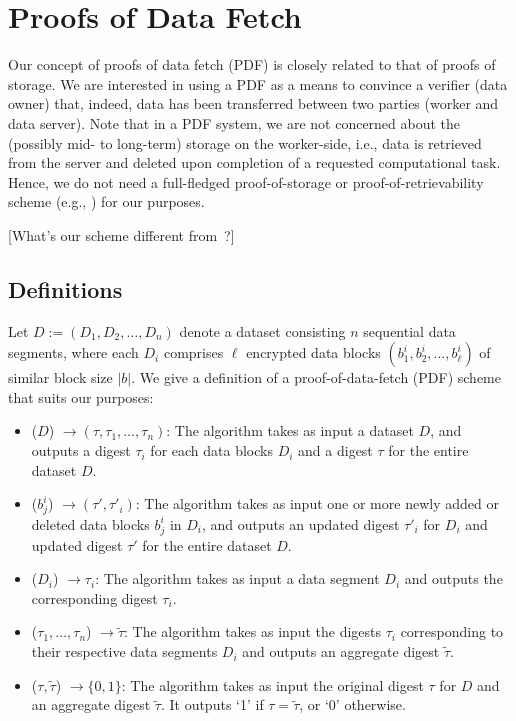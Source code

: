 \section{Proofs of Data Fetch} \label{sect:pdf}

Our concept of proofs of data fetch (PDF) is closely related to that of proofs of storage.
We are interested in using a PDF as a means to convince a verifier (data owner) that, indeed, data has been transferred between two parties (worker and data server).
Note that in a PDF system, we are not concerned about the (possibly mid- to long-term) storage on the worker-side, i.e., data is retrieved from the server and deleted upon completion of a requested computational task.
Hence, we do not need a full-fledged proof-of-storage or proof-of-retrievability scheme (e.g., \cite{JK07,AKK09,SW13}) for our purposes.


[What's our scheme different from~\cite{ADM+08}?]

\subsection{Definitions} \label{sect:pdf-definition}

Let $D := (D_1,D_2,\dotsc,D_n)$ denote a dataset consisting $n$ sequential data segments, where each $D_i$ comprises $\ell$ encrypted data blocks $(b^i_1,b^i_2,\dotsc,b^i_{\ell})$ of similar block size $|b|$.
We give a definition of a proof-of-data-fetch (PDF) scheme that suits our purposes:
\begin{itemize}
\item \Setup($D$) $\rightarrow (\tau,\tau_1,\dotsc,\tau_n)$: The algorithm takes as input a dataset $D$, and outputs a digest $\tau_i$ for each data blocks $D_i$ and a digest $\tau$ for the entire dataset $D$.

\item \Update($b^i_j$) $\rightarrow (\tau',\tau'_i)$: The algorithm takes as input one or more newly added or deleted data blocks $b^i_j$ in $D_i$, and outputs an updated digest $\tau'_i$ for $D_i$ and updated digest $\tau'$ for the entire dataset $D$.

\item \Prove($D_i$) $\rightarrow \tau_i$: The algorithm takes as input a data segment $D_i$ and outputs the corresponding digest $\tau_i$.

\item \Aggregate($\tau_1,\dotsc,\tau_n$) $\rightarrow \tilde{\tau}$: The algorithm takes as input the digests $\tau_i$ corresponding to their respective data segments $D_i$ and outputs an aggregate digest $\tilde{\tau}$.

\item \Verify($\tau, \tilde{\tau}$) $\rightarrow \{0,1\}$: The algorithm takes as input the original digest $\tau$ for $D$ and an aggregate digest $\tilde{\tau}$. It outputs `1' if $\tau=\tilde{\tau}$, or `0' otherwise.
\end{itemize}

